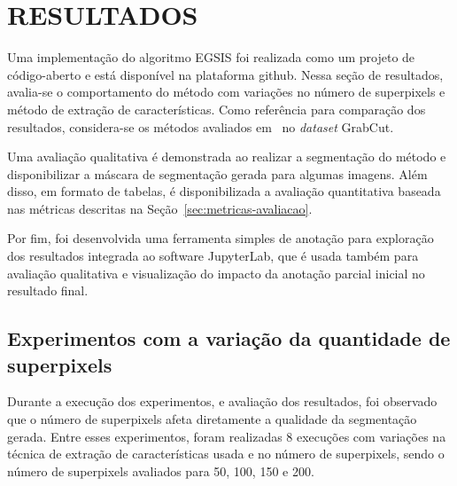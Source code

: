 \chapter{RESULTADOS}\label{chap:resultados}

Uma implementação do algoritmo EGSIS foi realizada como um projeto de
código-aberto e está disponível na plataforma
github\footnotemark. Nessa seção de resultados, avalia-se o
comportamento do método com variações no número de superpixels e
método de extração de características. Como referência para comparação
dos resultados, considera-se os métodos avaliados
em~\cite{wang2023review} no \textit{dataset} GrabCut.


Uma avaliação qualitativa é demonstrada ao realizar a segmentação do
método e disponibilizar a máscara de segmentação gerada para algumas
imagens. Além disso, em formato de tabelas, é disponibilizada a
avaliação quantitativa baseada nas métricas descritas na
Seção~\ref{sec:metricas-avaliacao}.

Por fim, foi desenvolvida uma ferramenta simples de anotação para
exploração dos resultados integrada ao software
JupyterLab\footnotemark, que é usada também para avaliação qualitativa
e visualização do impacto da anotação parcial inicial no resultado
final.


\section{Experimentos com a variação da quantidade de superpixels}\label{sec:variacao-superpixels}

Durante a execução dos experimentos, e avaliação dos resultados, foi
observado que o número de superpixels afeta diretamente a qualidade da
segmentação gerada. Entre esses experimentos, foram realizadas 8
execuções com variações na técnica de extração de características
usada e no número de superpixels, sendo o número de superpixels
avaliados para 50, 100, 150 e 200.

